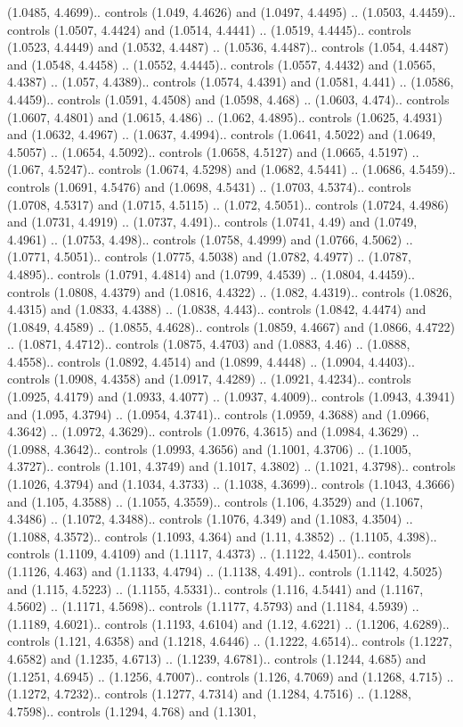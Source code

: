 (1.0485, 4.4699).. controls (1.049, 4.4626) and (1.0497, 4.4495) .. (1.0503, 4.4459).. controls (1.0507, 4.4424) and (1.0514, 4.4441) .. (1.0519, 4.4445).. controls (1.0523, 4.4449) and (1.0532, 4.4487) .. (1.0536, 4.4487).. controls (1.054, 4.4487) and (1.0548, 4.4458) .. (1.0552, 4.4445).. controls (1.0557, 4.4432) and (1.0565, 4.4387) .. (1.057, 4.4389).. controls (1.0574, 4.4391) and (1.0581, 4.441) .. (1.0586, 4.4459).. controls (1.0591, 4.4508) and (1.0598, 4.468) .. (1.0603, 4.474).. controls (1.0607, 4.4801) and (1.0615, 4.486) .. (1.062, 4.4895).. controls (1.0625, 4.4931) and (1.0632, 4.4967) .. (1.0637, 4.4994).. controls (1.0641, 4.5022) and (1.0649, 4.5057) .. (1.0654, 4.5092).. controls (1.0658, 4.5127) and (1.0665, 4.5197) .. (1.067, 4.5247).. controls (1.0674, 4.5298) and (1.0682, 4.5441) .. (1.0686, 4.5459).. controls (1.0691, 4.5476) and (1.0698, 4.5431) .. (1.0703, 4.5374).. controls (1.0708, 4.5317) and (1.0715, 4.5115) .. (1.072, 4.5051).. controls (1.0724, 4.4986) and (1.0731, 4.4919) .. (1.0737, 4.491).. controls (1.0741, 4.49) and (1.0749, 4.4961) .. (1.0753, 4.498).. controls (1.0758, 4.4999) and (1.0766, 4.5062) .. (1.0771, 4.5051).. controls (1.0775, 4.5038) and (1.0782, 4.4977) .. (1.0787, 4.4895).. controls (1.0791, 4.4814) and (1.0799, 4.4539) .. (1.0804, 4.4459).. controls (1.0808, 4.4379) and (1.0816, 4.4322) .. (1.082, 4.4319).. controls (1.0826, 4.4315) and (1.0833, 4.4388) .. (1.0838, 4.443).. controls (1.0842, 4.4474) and (1.0849, 4.4589) .. (1.0855, 4.4628).. controls (1.0859, 4.4667) and (1.0866, 4.4722) .. (1.0871, 4.4712).. controls (1.0875, 4.4703) and (1.0883, 4.46) .. (1.0888, 4.4558).. controls (1.0892, 4.4514) and (1.0899, 4.4448) .. (1.0904, 4.4403).. controls (1.0908, 4.4358) and (1.0917, 4.4289) .. (1.0921, 4.4234).. controls (1.0925, 4.4179) and (1.0933, 4.4077) .. (1.0937, 4.4009).. controls (1.0943, 4.3941) and (1.095, 4.3794) .. (1.0954, 4.3741).. controls (1.0959, 4.3688) and (1.0966, 4.3642) .. (1.0972, 4.3629).. controls (1.0976, 4.3615) and (1.0984, 4.3629) .. (1.0988, 4.3642).. controls (1.0993, 4.3656) and (1.1001, 4.3706) .. (1.1005, 4.3727).. controls (1.101, 4.3749) and (1.1017, 4.3802) .. (1.1021, 4.3798).. controls (1.1026, 4.3794) and (1.1034, 4.3733) .. (1.1038, 4.3699).. controls (1.1043, 4.3666) and (1.105, 4.3588) .. (1.1055, 4.3559).. controls (1.106, 4.3529) and (1.1067, 4.3486) .. (1.1072, 4.3488).. controls (1.1076, 4.349) and (1.1083, 4.3504) .. (1.1088, 4.3572).. controls (1.1093, 4.364) and (1.11, 4.3852) .. (1.1105, 4.398).. controls (1.1109, 4.4109) and (1.1117, 4.4373) .. (1.1122, 4.4501).. controls (1.1126, 4.463) and (1.1133, 4.4794) .. (1.1138, 4.491).. controls (1.1142, 4.5025) and (1.115, 4.5223) .. (1.1155, 4.5331).. controls (1.116, 4.5441) and (1.1167, 4.5602) .. (1.1171, 4.5698).. controls (1.1177, 4.5793) and (1.1184, 4.5939) .. (1.1189, 4.6021).. controls (1.1193, 4.6104) and (1.12, 4.6221) .. (1.1206, 4.6289).. controls (1.121, 4.6358) and (1.1218, 4.6446) .. (1.1222, 4.6514).. controls (1.1227, 4.6582) and (1.1235, 4.6713) .. (1.1239, 4.6781).. controls (1.1244, 4.685) and (1.1251, 4.6945) .. (1.1256, 4.7007).. controls (1.126, 4.7069) and (1.1268, 4.715) .. (1.1272, 4.7232).. controls (1.1277, 4.7314) and (1.1284, 4.7516) .. (1.1288, 4.7598).. controls (1.1294, 4.768) and (1.1301, 